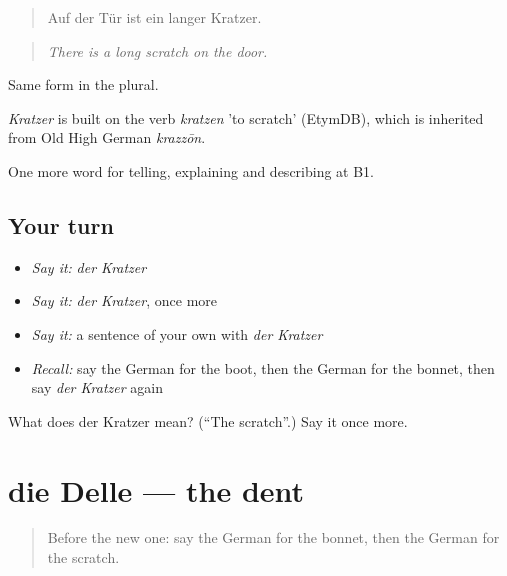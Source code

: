 \begin{quote}
Auf der Tür ist ein langer Kratzer.
\end{quote}

\begin{quote}
\emph{There is a long scratch on the door.}
\end{quote}

Same form in the plural.

\begin{cousinweb}
\emph{Kratzer} is built on the verb \emph{kratzen} 'to scratch' (EtymDB), which is inherited from Old High German \emph{krazzōn}.
\end{cousinweb}

\begin{grammarlens}[title={What you've built}]
One more word for telling, explaining and describing at B1.
\end{grammarlens}

\subsection*{Your turn}
\begin{itemize}
\raggedright
  \item \emph{Say it:} \emph{der Kratzer}
  \item \emph{Say it:} \emph{der Kratzer}, once more
  \item \emph{Say it:} a sentence of your own with \emph{der Kratzer}
  \item \emph{Recall:} say the German for the boot, then the German for the bonnet, then say \emph{der Kratzer} again
\end{itemize}

\begin{tcolorbox}[breakable,colback=teal!4,colframe=teal!35!black,title={Before you move on}]
What does der Kratzer mean? (\textquotedblleft{}The scratch\textquotedblright{}.) Say it once more.
\end{tcolorbox}
\section[die Delle]{die Delle — the dent}

\label{lesson:GE-C405-delle}



\begin{quote}
Before the new one: say the German for the bonnet, then the German for the scratch.
\end{quote}

